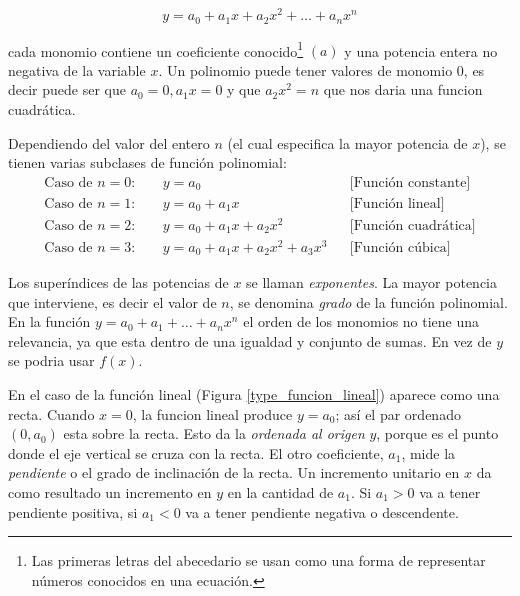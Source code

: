 \[
y=a_0+a_1x+a_2x^2+\dots+a_nx^n
\]

cada monomio contiene un coeficiente conocido\footnote{Las primeras letras del abecedario se usan como una forma de representar números conocidos en una ecuación.} \((a)\) y una potencia entera no negativa de la variable \(x\). Un polinomio puede tener valores de monomio \(0\), es decir puede ser que \(a_0 = 0, a_1x = 0\) y que \(a_2x^2 = n\) que nos daria una funcion cuadrática.

Dependiendo del valor del entero \(n\) (el cual especifica la mayor potencia de \(x\)), se tienen varias subclases de función polinomial:
\[
\begin{aligned}
\text{Caso de } n=0: & \quad y=a_0 && \text{[Función constante]} \\
\text{Caso de } n=1: & \quad y=a_0+a_1x && \text{[Función lineal]} \\
\text{Caso de } n=2: & \quad y=a_0+a_1x+a_2x^2 && \text{[Función cuadrática]} \\
\text{Caso de } n=3: & \quad y=a_0+a_1x+a_2x^2+a_3x^3 && \text{[Función cúbica]}
\end{aligned}
\]

Los superíndices de las potencias de \(x\) se llaman \textit{exponentes}. La mayor potencia que interviene, es decir el valor de \(n\), se denomina \textit{grado} de la función polinomial. En la función \(y = a_0+ a_1 + \dots +a_nx^n\) el orden de los monomios no tiene una relevancia, ya que esta dentro de una igualdad y conjunto de sumas. En vez de \(y\) se podria usar \(f(x)\).

En el caso de la función lineal (Figura \ref{type_funcion_lineal}) aparece como una recta. Cuando \(x=0\), la funcion lineal produce \(y=a_0\); así el par ordenado \((0,a_0)\) esta sobre la recta. Esto da la \textit{ordenada al origen} \(y\), porque es el punto donde el eje vertical se cruza con la recta. El otro coeficiente, \(a_1\), mide la \textit{pendiente} o el grado de inclinación de la recta. Un incremento unitario en \(x\) da como resultado un incremento en \(y\) en la cantidad de \(a_1\). Si \(a_1 > 0\) va a tener pendiente positiva, si \(a_1 < 0\) va a tener pendiente negativa o descendente.

